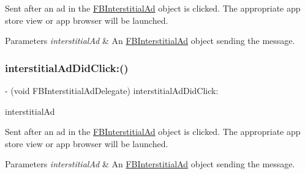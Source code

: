 Sent after an ad in the \hyperlink{interfaceFBInterstitialAd}{F\+B\+Interstitial\+Ad} object is clicked. The appropriate app store view or app browser will be launched.


\begin{DoxyParams}{Parameters}
{\em interstitial\+Ad} & An \hyperlink{interfaceFBInterstitialAd}{F\+B\+Interstitial\+Ad} object sending the message. \\
\hline
\end{DoxyParams}
\mbox{\label{protocolFBInterstitialAdDelegate_01-p_a03799a3b2c114c7169b0cb1cf7c81132}} 
\subsubsection{\texorpdfstring{interstitial\+Ad\+Did\+Click\+:()}{interstitialAdDidClick:()}\hspace{0.1cm}{\footnotesize\ttfamily [4/5]}}
{\footnotesize\ttfamily -\/ (void F\+B\+Interstitial\+Ad\+Delegate) interstitial\+Ad\+Did\+Click\+: \begin{DoxyParamCaption}\item[{(\hyperlink{interfaceFBInterstitialAd}{F\+B\+Interstitial\+Ad} $\ast$)}]{interstitial\+Ad }\end{DoxyParamCaption}\hspace{0.3cm}{\ttfamily [optional]}}

Sent after an ad in the \hyperlink{interfaceFBInterstitialAd}{F\+B\+Interstitial\+Ad} object is clicked. The appropriate app store view or app browser will be launched.


\begin{DoxyParams}{Parameters}
{\em interstitial\+Ad} & An \hyperlink{interfaceFBInterstitialAd}{F\+B\+Interstitial\+Ad} object sending the message. \\
\hline
\end{DoxyParams}
\mbox{\label{protocolFBInterstitialAdDelegate_01-p_a03799a3b2c114c7169b0cb1cf7c81132}} 
